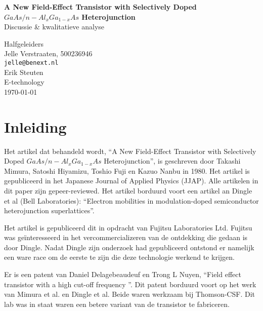 \documentclass[11pt]{report}
\newlength{\leftbarwidth}
\newlength{\leftbarsep}
\newcommand*{\leftbarcolorcmd}{\color{leftbarcolor}}%
\renewenvironment{leftbar}{%
    \def\FrameCommand{{\leftbarcolorcmd{\vrule width \leftbarwidth\relax\hspace {\leftbarsep}}}}%
    \MakeFramed {\advance \hsize -\width \FrameRestore }}{\endMakeFramed}
\begin{document}
\begin{titlepage}
\begin{center}
{\huge\bfseries A New Field-Effect Transistor with Selectively Doped $GaAs/n-Al_{x}Ga_{1-x}As$ Heterojunction}
\\ \bigskip
{\Large Discussie \& kwalitatieve analyse}
\end{center}
\vfill
\begin{flushleft}
\setlength{\leftbarwidth}{1pt}
\begin{leftbar}
Halfgeleiders \\
Jelle Verstraaten, 500236946 \\
\texttt{jelle@benext.nl} \\
Erik Steuten\\
E-technology \\
{\small \today} \\
\end{leftbar}
\end{flushleft}
\end{titlepage}

\tableofcontents

\chapter{Inleiding}

Het artikel dat behandeld wordt, ``A New Field-Effect Transistor with Selectively Doped $GaAs/n-Al_{x}Ga_{1-x}As$ Heterojunction'', is geschreven door Takashi Mimura, Satoshi Hiyamizu, Toshio Fuji en Kazuo Nanbu in 1980. Het artikel is gepubliceerd in het Japanese Journal of Applied Physics (JJAP). Alle artikelen in dit paper zijn gepeer-reviewed. Het artikel borduurd voort een artikel an Dingle et al (Bell Laboratories): ``Electron mobilities in modulation-doped semiconductor heterojunction superlattices''.

Het artikel is gepubliceerd dit in opdracht van Fujitsu Laboratories Ltd. Fujitsu was ge\"interesseerd in het vercommercializeren van de ontdekking die gedaan is door Dingle. Nadat Dingle zijn onderzoek had gepubliceerd ontstond er namelijk een ware race om de eerste te zijn die deze technologie werkend te krijgen.

Er is een patent van Daniel Delagebeaudeuf en Trong L Nuyen, ``Field effect transistor with a high cut-off frequency ''. Dit patent borduurd voort op het werk van Mimura et al. en Dingle et al. Beide waren werkzaam bij Thomson-CSF. Dit lab was in staat waren een betere variant van de transistor te fabriceren. 
\end{document}
